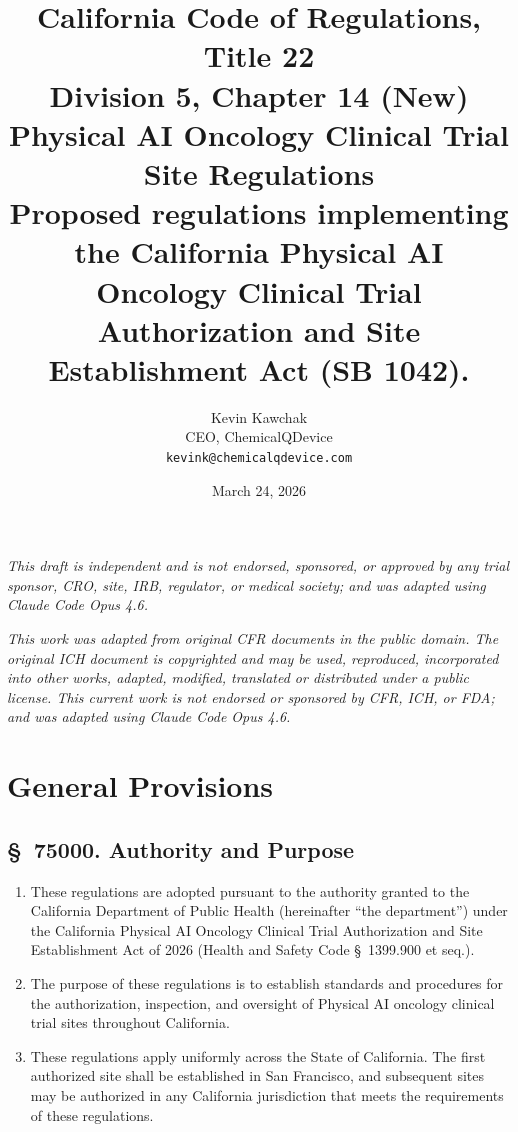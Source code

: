 \documentclass[11pt,letterpaper]{article}
\title{%
  \textbf{California Code of Regulations, Title 22}\\[6pt]
  \large Division 5, Chapter 14 (New)\\
  Physical AI Oncology Clinical Trial Site Regulations\\[6pt]
  \normalsize Proposed regulations implementing the California Physical AI\\
  Oncology Clinical Trial Authorization and Site Establishment Act (SB 1042).
}
\author{%
  Kevin Kawchak\\
  CEO, ChemicalQDevice\\
  \texttt{kevink@chemicalqdevice.com}
}
\date{March 24, 2026}
\begin{document}
\maketitle
\thispagestyle{fancy}

\begin{center}
\footnotesize
\textit{This draft is independent and is not endorsed, sponsored, or approved
by any trial sponsor, CRO, site, IRB, regulator, or medical society;
and was adapted using Claude Code Opus 4.6.}
\end{center}

\vspace{0.5em}

\begin{center}
\footnotesize
\textit{This work was adapted from original CFR documents in the public domain.
The original ICH document is copyrighted and may be used, reproduced,
incorporated into other works, adapted, modified, translated or distributed
under a public license. This current work is not endorsed or sponsored by
CFR, ICH, or FDA; and was adapted using Claude Code Opus 4.6.}
\end{center}

\vspace{1em}
\tableofcontents
\newpage

\section{General Provisions}

\subsection{\S~75000. Authority and Purpose}

\begin{enumerate}[label=(\alph*)]
\item These regulations are adopted pursuant to the authority granted to the
  California Department of Public Health (hereinafter ``the department'') under
  the California Physical AI Oncology Clinical Trial Authorization and Site
  Establishment Act of 2026 (Health and Safety Code \S~1399.900 et seq.).

\item The purpose of these regulations is to establish standards and procedures
  for the authorization, inspection, and oversight of Physical AI oncology
  clinical trial sites throughout California.

\item These regulations apply uniformly across the State of California. The
  first authorized site shall be established in San Francisco, and subsequent
  sites may be authorized in any California jurisdiction that meets the
  requirements of these regulations.
\end{enumerate}
\end{document}
